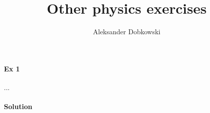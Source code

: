 \documentclass{article}
\title{Other physics exercises}
\author{Aleksander Dobkowski}
\date{}
\begin{document}
\maketitle

\paragraph{Ex 1}
...
\paragraph{Solution}
\end{document}
